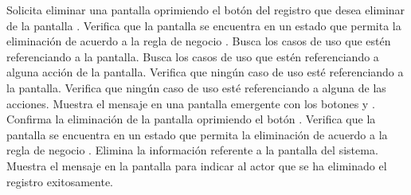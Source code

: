  \begin{UCtrayectoria}
    \UCpaso[\UCactor] Solicita eliminar una pantalla oprimiendo el botón \btnEliminar del registro que desea eliminar de la pantalla .
    \UCpaso[\UCsist] Verifica que la pantalla se encuentra en un estado que permita la eliminación de acuerdo a la regla de negocio . 
    \UCpaso[\UCsist] Busca los casos de uso que estén referenciando a la pantalla.
    \UCpaso[\UCsist] Busca los casos de uso que estén referenciando a alguna acción de la pantalla.
    \UCpaso[\UCsist] Verifica que ningún caso de uso esté referenciando a la pantalla. 
    \UCpaso[\UCsist] Verifica que ningún caso de uso esté referenciando a alguna de las acciones. 
    \UCpaso[\UCsist] Muestra el mensaje  en una pantalla emergente con los botones  y .
    \UCpaso[\UCactor] Confirma la eliminación de la pantalla oprimiendo el botón . 
    \UCpaso[\UCsist] Verifica que la pantalla se encuentra en un estado que permita la eliminación de acuerdo a la regla de negocio . 
    \UCpaso[\UCsist] Elimina la información referente a la pantalla del sistema.
    \UCpaso[\UCsist] Muestra el mensaje  en la pantalla 
    para indicar al actor que se ha eliminado el registro exitosamente.
 \end{UCtrayectoria}
 
